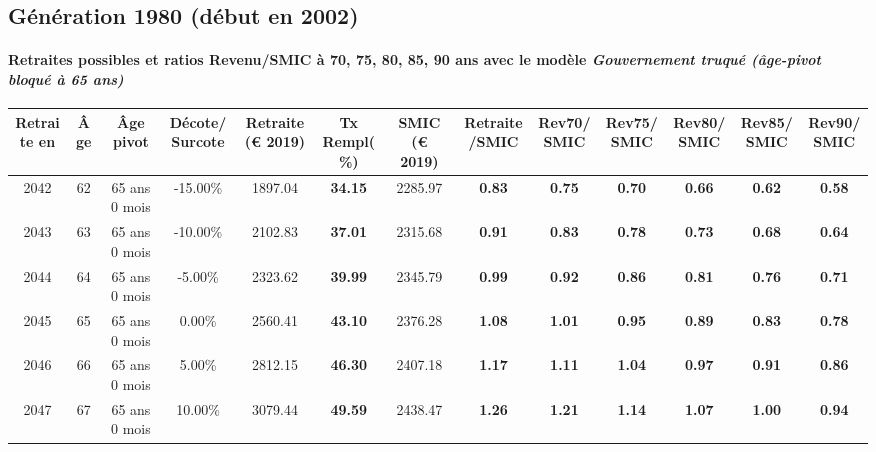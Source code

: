 \newpage 
 
\subsection{Génération 1980 (début en 2002)} 

\paragraph{Retraites possibles et ratios Revenu/SMIC à 70, 75, 80, 85, 90 ans avec le modèle \emph{Gouvernement truqué (âge-pivot bloqué à 65 ans)}}  
 
{ \scriptsize \begin{center} 
\begin{tabular}[htb]{|c|c||c|c||c|c||c||c|c|c|c|c|c|} 
\hline 
 Retraite en &  Âge &  Âge pivot &  Décote/Surcote &  Retraite (\euro{} 2019) &  Tx Rempl(\%) &  SMIC (\euro{} 2019) &  Retraite/SMIC &  Rev70/SMIC &  Rev75/SMIC &  Rev80/SMIC &  Rev85/SMIC &  Rev90/SMIC \\ 
\hline \hline 
 2042 &  62 &  65 ans 0 mois &  -15.00\% &  1897.04 &  {\bf 34.15} &  2285.97 &  {\bf {\color{red} 0.83}} &  {\bf {\color{red} 0.75}} &  {\bf {\color{red} 0.70}} &  {\bf {\color{red} 0.66}} &  {\bf {\color{red} 0.62}} &  {\bf {\color{red} 0.58}} \\ 
\hline 
 2043 &  63 &  65 ans 0 mois &  -10.00\% &  2102.83 &  {\bf 37.01} &  2315.68 &  {\bf {\color{red} 0.91}} &  {\bf {\color{red} 0.83}} &  {\bf {\color{red} 0.78}} &  {\bf {\color{red} 0.73}} &  {\bf {\color{red} 0.68}} &  {\bf {\color{red} 0.64}} \\ 
\hline 
 2044 &  64 &  65 ans 0 mois &  -5.00\% &  2323.62 &  {\bf 39.99} &  2345.79 &  {\bf {\color{red} 0.99}} &  {\bf {\color{red} 0.92}} &  {\bf {\color{red} 0.86}} &  {\bf {\color{red} 0.81}} &  {\bf {\color{red} 0.76}} &  {\bf {\color{red} 0.71}} \\ 
\hline 
 2045 &  65 &  65 ans 0 mois &  0.00\% &  2560.41 &  {\bf 43.10} &  2376.28 &  {\bf 1.08} &  {\bf 1.01} &  {\bf {\color{red} 0.95}} &  {\bf {\color{red} 0.89}} &  {\bf {\color{red} 0.83}} &  {\bf {\color{red} 0.78}} \\ 
\hline 
 2046 &  66 &  65 ans 0 mois &  5.00\% &  2812.15 &  {\bf 46.30} &  2407.18 &  {\bf 1.17} &  {\bf 1.11} &  {\bf 1.04} &  {\bf {\color{red} 0.97}} &  {\bf {\color{red} 0.91}} &  {\bf {\color{red} 0.86}} \\ 
\hline 
 2047 &  67 &  65 ans 0 mois &  10.00\% &  3079.44 &  {\bf 49.59} &  2438.47 &  {\bf 1.26} &  {\bf 1.21} &  {\bf 1.14} &  {\bf 1.07} &  {\bf 1.00} &  {\bf {\color{red} 0.94}} \\ 
\hline 
\hline 
\end{tabular} 
\end{center} } 

